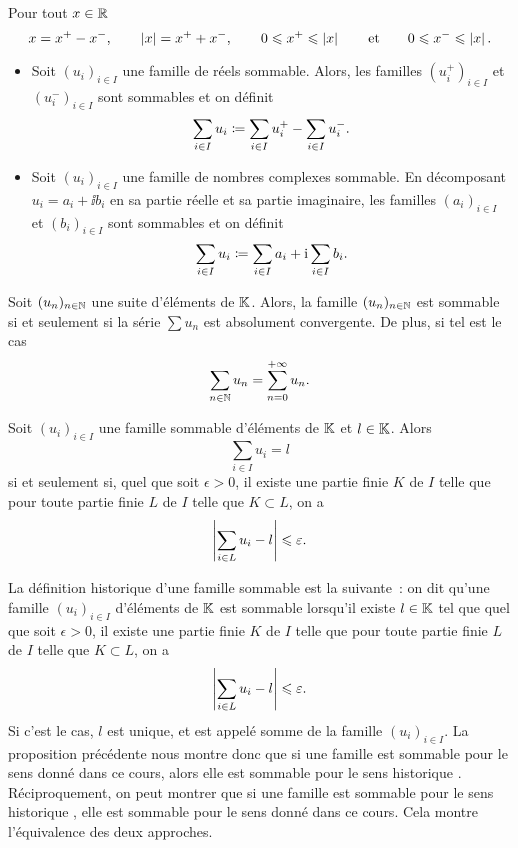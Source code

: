 \documentclass{magnolia}
\begin{document}
\begin{proposition}
Pour tout $x\in\mathbb{R}$
\[x=x^+ - x^-,\qquad \left|x\right|=x^+ + x^-,\qquad
  0\leqslant x^+\leqslant \left|x\right| \qquad\text{et}\qquad
  0\leqslant x^-\leqslant \left|x\right|.\]
\end{proposition}

\begin{definition}
\begin{itemize}
\item Soit $(u_i)_{i\in I}$ une famille de réels sommable. Alors, les familles $(u_i^{+})_{i\in I}$ et
  $(u_i^{-})_{i\in I}$ sont sommables et on définit
  \[\sum_{i\in I} u_i\coloneqq \sum_{i\in I} u_i^{+} - \sum_{i\in I} u_i^{-}.\]
\item Soit $(u_i)_{i\in I}$ une famille de nombres complexes sommable. En décomposant $u_i = a_i + \ii b_i$ en sa
  partie réelle et sa partie imaginaire, les familles $(a_i)_{i\in I}$ et $(b_i)_{i\in I}$ sont sommables et on définit
  \[\sum_{i\in I} u_i\coloneqq \sum_{i\in I} a_i + {\rm i} \sum_{i\in I} b_i.\]
\end{itemize}
\end{definition}


\begin{proposition}
Soit $(u_n)_{n\in\mathbb{N}}$ une suite d'éléments de $\mathbb{K}$. Alors, la famille $(u_n)_{n\in\mathbb{N}}$ est
sommable si et seulement si la série $\sum u_n$ est absolument convergente. De plus, si tel est le
cas
\[\sum_{n\in\mathbb{N}} u_n=\sum_{n=0}^{+\infty} u_n.\]
\end{proposition}
  

\begin{proposition}
Soit $(u_i)_{i\in I}$ une famille sommable d'éléments de $\mathbb{K}$ et $l\in\mathbb{K}$. Alors
\[\sum_{i\in I} u_i=l\]
si et seulement si, quel que soit $\epsilon>0$, il existe une partie finie $K$ de $I$ telle que
pour toute partie finie $L$ de $I$ telle que $K\subset L$, on a
\[\left|\sum_{i\in L} u_i - l\right|\leqslant\varepsilon.\]
\end{proposition}

\begin{remarqueUnique}
\remarque La définition \og historique \fg d'une famille sommable est la suivante~: on dit
  qu'une famille $(u_i)_{i\in I}$ d'éléments de $\mathbb{K}$ est sommable lorsqu'il existe $l\in\mathbb{K}$ tel que quel
  que soit $\epsilon>0$, il existe une partie finie $K$ de $I$ telle que pour toute partie finie $L$ de
  $I$ telle que $K\subset L$, on a
  \[\left|\sum_{i\in L} u_i - l\right|\leqslant\varepsilon.\]
  Si c'est le cas, $l$ est unique, et est appelé somme de la famille $(u_i)_{i\in I}$. La proposition
  précédente nous montre donc que si une famille est sommable pour le sens donné dans ce cours,
  alors elle est sommable pour le sens \og historique \fg. Réciproquement, on peut montrer que si une famille
  est sommable pour le sens \og historique \fg, elle est sommable pour le sens donné dans ce cours.
  Cela montre l'équivalence des deux approches.
\end{remarqueUnique}
\end{document}
